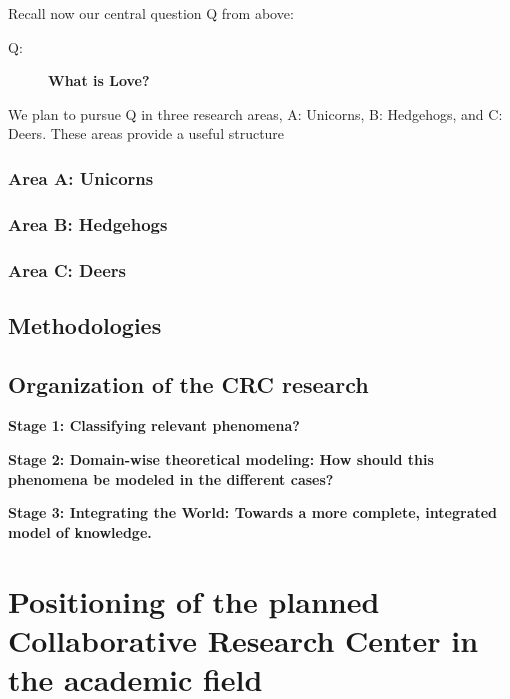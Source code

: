 Recall now our central question Q from above: 

\begin{description}
\item[Q:] \textbf{What is Love?} 
\end{description}

We plan to pursue Q in three research areas, A: Unicorns,
B: Hedgehogs, and C: Deers. These areas
provide a useful structure \blindtext

\subsubsection{Area A: Unicorns}

\blindtext
\subsubsection{Area B: Hedgehogs}

\blindtext

\subsubsection{Area C: Deers}

\blindtext

\subsection{Methodologies}

\blindtext

\subsection{Organization of the CRC research}

\blindtext
\textbf{Stage 1: Classifying relevant phenomena?}

\blindtext


\textbf{Stage 2: Domain-wise theoretical modeling: How should this
  phenomena be modeled in the different cases?}
\blindtext


\textbf{Stage 3: Integrating the World: Towards a more complete,
  integrated model of knowledge.}

\blindtext


\section{Positioning of the planned Collaborative Research Center in
  the academic field}

